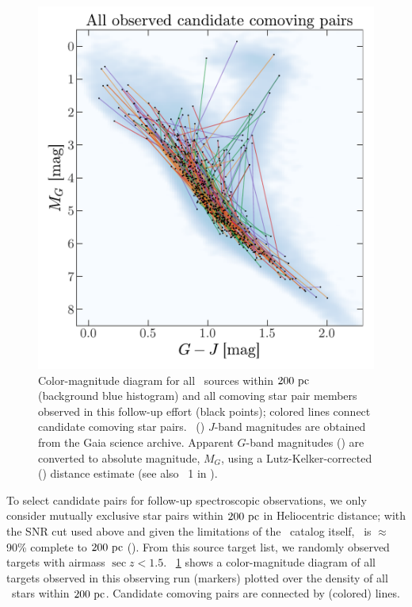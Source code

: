 \documentclass[modern, letterpaper]{aastex61}
\newcommand{\tgas}{\acronym{TGAS}}
\newcommand{\tmass}{\acronym{2MASS}}
\begin{document}
\begin{figure}[ht!]
  \begin{center}
    \includegraphics[width=0.8\linewidth]{sample_cmd.pdf}
  \end{center}
  \caption{%
    Color-magnitude diagram for all \tgas\ sources within $200~\mathrm{pc}$ (background
    blue histogram) and all comoving star pair members observed in this
    follow-up effort (black points); colored lines connect candidate comoving
    star pairs.
    \tmass\ (\citealt{Skrutskie:2006}) $J$-band magnitudes are obtained
    from the Gaia science archive.
    Apparent $G$-band magnitudes (\citealt{Carrasco:2016}) are converted to
    absolute magnitude, $M_G$, using a Lutz-Kelker-corrected
    (\citealt{Lutz:1973}) distance estimate (see also \eqname~1 in
    \citealt{Oh:2017}).
    \label{fig:sample-cmd}}
\end{figure}

To select candidate pairs for follow-up spectroscopic observations, we only
consider mutually exclusive star pairs within $200~\mathrm{pc}$ in Heliocentric
distance; with the SNR cut used above and given the limitations of the \tgas\
catalog itself, \tgas\ is $\approx$90\% complete to $200~\mathrm{pc}$
(\citealt{Bovy:2017}).
From this source target list, we randomly observed targets with airmass $\sec z
< 1.5$.
\figurename~\ref{fig:sample-cmd} shows a color-magnitude diagram of all targets
observed in this observing run (markers) plotted over the density of all \tgas\
stars within $200~\mathrm{pc}$.
Candidate comoving pairs are connected by (colored) lines.
\end{document}
